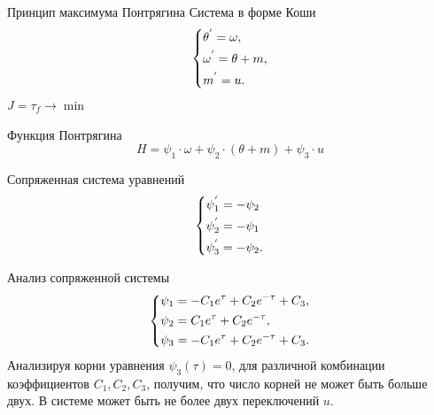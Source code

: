 \documentclass[10pt]{beamer}
\begin{document}
\begin{frame}{Принцип максимума Понтрягина}
	Система в форме Коши
	\begin{equation}\label{koshisystem}
		\left\{ {\begin{aligned}
					 & \theta^{'} = \omega , \hfill   \\
					 & \omega^{'} = \theta+m , \hfill \\
					 & m^{'} = u . \hfill             \\
				\end{aligned}} \right.
	\end{equation}
	$J=\tau_f\to \min$
	
	Функция Понтрягина
	\[
		H=\psi_1\cdot\omega+\psi_2\cdot(\theta+m)+\psi_3\cdot u
	\]

	Сопряженная система уравнений
	\begin{equation} \label{7}
		\left\{ {\begin{aligned}
					 & \psi^{'}_1  = - \psi_2\hfill     \\
					 & \psi^{'}_2   = - \psi_1\hfill    \\
					 & \psi^{'}_3   = - \psi_2 . \hfill \\
				\end{aligned}} \right.
	\end{equation}

\end{frame}

\begin{frame}{Анализ сопряженной системы}
	\begin{equation}\label{psisystem}
		\left\{ {\begin{aligned}
					 & \psi_1 = -C_1e^\tau+C_2e^{-\tau}+C_3, \hfill  \\
					 & \psi_2 = C_1e^\tau+C_2e^{-\tau} , \hfill      \\
					 & \psi_3 = -C_1e^\tau+C_2e^{-\tau}+C_3 . \hfill \\
				\end{aligned}} \right.
	\end{equation}
	Анализируя корни уравнения $\psi_3(\tau)=0$, для различной комбинации
	коэффициентов $C_1,C_2,C_3$, получим, что число корней не может быть больше двух. В системе может быть не более двух переключений $u$.
\end{frame}
\end{document}
